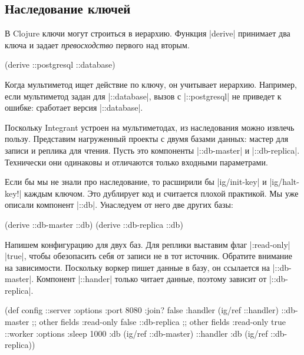 \subsection{Наследование ключей}

В Clojure ключи могут строиться в иерархию. Функция \spverb|derive| принимает
два ключа и задает \emph{превосходство} первого над вторым.

\begin{english}
  \begin{clojure}
(derive ::postgresql ::database)
  \end{clojure}
\end{english}

Когда мультиметод ищет действие по ключу, он учитывает иерархию. Например, если
мультиметод задан для \spverb|::database|, вызов с \spverb|::postgresql| не
приведет к ошибке: сработает версия \spverb|::database|.

Поскольку Integrant устроен на мультиметодах, из наследования можно
извлечь пользу. Представим нагруженный проекты с двумя базами данных: мастер для
записи и реплика для чтения. Пусть это компоненты \spverb|::db-master| и
\spverb|::db-replica|. Технически они одинаковы и отличаются только входными
параметрами.

Если бы мы не знали про наследование, то расширили бы \spverb|ig/init-key| и
\spverb|ig/halt-key!| каждым ключом. Это дублирует код и считается плохой
практикой. Мы уже описали компонент \spverb|::db|. Унаследуем от него две других
базы:

\begin{english}
  \begin{clojure}
(derive ::db-master ::db)
(derive ::db-replica ::db)
  \end{clojure}
\end{english}

Напишем конфигурацию для двух баз. Для реплики выставим флаг \spverb|:read-only|
\spverb|true|, чтобы обезопасить себя от записи не в тот источник. Обратите
внимание на зависимости. Поскольку воркер пишет данные в базу, он ссылается на
\spverb|::db-master|. Компонент \spverb|::hander| только читает данные, поэтому
зависит от \spverb|::db-replica|.

\begin{english}
  \begin{clojure}
(def config
  {::server {:options {:port 8080 :join? false}
             :handler (ig/ref ::handler)}
   ::db-master {;; other fields
                :read-only false}
   ::db-replica {;; other fields
                 :read-only true}
   ::worker {:options {:sleep 1000}
             :db (ig/ref ::db-master)}
   ::handler {:db (ig/ref ::db-replica)}})
  \end{clojure}
\end{english}


